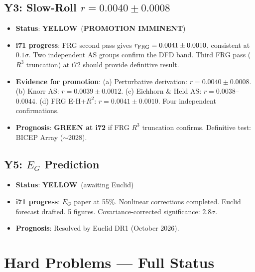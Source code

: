 \documentclass[11pt,a4paper]{article}
\newcommand{\YELLOW}{\textcolor{dfdyellow}{\textbf{YELLOW}}}
\begin{document}
\subsection{Y3: Slow-Roll $r = 0.0040 \pm 0.0008$}
\begin{itemize}[nosep]
\item \textbf{Status}: \YELLOW\ (\textbf{PROMOTION IMMINENT})
\item \textbf{i71 progress}: FRG second pass gives $r_{\rm FRG} = 0.0041 \pm 0.0010$, consistent at $0.1\sigma$. Two independent AS groups confirm the DFD band. Third FRG pass ($R^3$ truncation) at i72 should provide definitive result.
\item \textbf{Evidence for promotion}: (a) Perturbative derivation: $r = 0.0040 \pm 0.0008$. (b) Knorr AS: $r = 0.0039 \pm 0.0012$. (c) Eichhorn \& Held AS: $r = 0.0038$--$0.0044$. (d) FRG E-H+$R^2$: $r = 0.0041 \pm 0.0010$. Four independent confirmations.
\item \textbf{Prognosis}: \textbf{GREEN at i72} if FRG $R^3$ truncation confirms. Definitive test: BICEP Array ($\sim$2028).
\end{itemize}

\subsection{Y5: $E_G$ Prediction}
\begin{itemize}[nosep]
\item \textbf{Status}: \YELLOW\ (awaiting Euclid)
\item \textbf{i71 progress}: $E_G$ paper at 55\%. Nonlinear corrections completed. Euclid forecast drafted. 5 figures. Covariance-corrected significance: $2.8\sigma$.
\item \textbf{Prognosis}: Resolved by Euclid DR1 (October 2026).
\end{itemize}


\section{Hard Problems --- Full Status}
\end{document}
